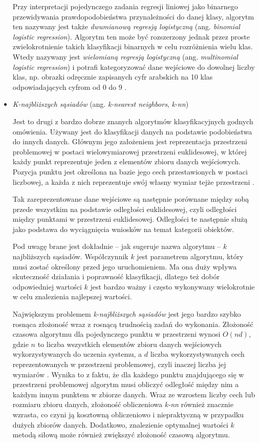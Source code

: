 \begin{itemize}
        Przy interpretacji pojedynczego zadania regresji liniowej jako binarnego przewidywania prawdopodobieństwa przynależności do danej klasy, algorytm ten nazywany jest także \emph{dwumianową regresją logistyczną} (ang. \emph{binomial logistic regression}).
        Algorytm ten może być rozszerzony jednak przez proste zwielokrotnienie takich klasyfikacji binarnych w celu rozróżnienia wielu klas.
        Wtedy nazywany jest \emph{wielomianą regresją logistyczną} (ang. \emph{multinomial logistic regression}) i potrafi kategoryzować dane wejściowe do dowolnej liczby klas, np. obrazki odręcznie zapisanych cyfr arabskich na 10 klas odpowiadających cyfrom od 0 do 9 \cite{palvanov2018comparisons}.

  \item \emph{K-najbliższych sąsiadów} (ang. \emph{k-nearest neighbors}, \emph{k-nn})

        Jest to drugi z bardzo dobrze znanych algorytmów klasyfikacyjnych godnych omówienia.
        Używany jest do klasyfikacji danych na podstawie podobieństwa do innych danych.
        Głównym jego założeniem jest reprezentacja przestrzeni problemowej w postaci wielowymiarowej przestrzeni euklidesowej, w której każdy punkt reprezentuje jeden z elementów zbioru danych wejściowych.
        Pozycja punktu jest określona na bazie jego cech przestawionych w postaci liczbowej, a każda z nich reprezentuje swój własny wymiar tejże przestrzeni \cite{kramer2013k}.

        Tak zareprezentowane dane wejściowe są następnie porównane między sobą przede wszystkim na podstawie odległości euklidesowej, czyli odległości między punktami w przestrzeni euklidesowej.
        Odległości te następnie służą jako podstawa do wyciągnięcia wniosków na temat kategorii obiektów.

        Pod uwagę brane jest dokładnie -- jak sugeruje nazwa algorytmu -- $k$ najbliższych sąsiadów.
        Współczynnik $k$ jest parametrem algorytmu, który musi zostać określony przed jego uruchomieniem.
        Ma ona duży wpływa skuteczność działania i poprawność klasyfikacji, dlatego też dobór odpowiedniej wartości $k$ jest bardzo ważny i często wykonywany wielokrotnie w celu znalezienia najlepszej wartości.

        Największym problemem \emph{k-najbliższych sąsiadów} jest jego bardzo szybko rosnąca złożoność wraz z rosnącą trudnością zadań do wykonania.
        Złożoność czasowa algorytmu dla pojedynczego punktu w przestrzeni wynosi $O(nd)$, gdzie $n$ to liczba wszystkich elementów zbioru danych wejściowych wykorzystywanych do uczenia systemu, a $d$ liczba wykorzystywanych cech reprezentowanych w przestrzeni problemowej, czyli inaczej liczba jej wymiarów \cite{laviale2023deep}.
        Wynika to z faktu, że dla każdego punktu znajdującego się w przestrzeni problemowej algorytm musi obliczyć odległość między nim a każdym innym punktem w zbiorze danych.
        Wraz ze wzrostem liczby cech lub rozmiaru zbioru danych, złożoność obliczeniowa \emph{k-nn} również znacznie wzrasta, co czyni ją kosztowną obliczeniowo i niepraktyczną w przypadku dużych zbiorów danych.
        Dodatkowo, znalezienie optymalnej wartości $k$ metodą siłową może również zwiększyć złożoność czasową algorytmu.


\end{itemize}
